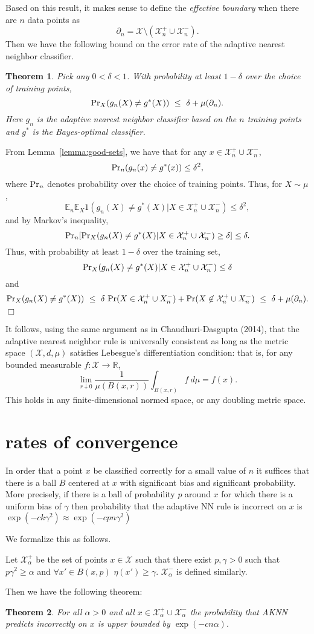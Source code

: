 \documentclass{article}
\def\R{{\mathbb{R}}}
\def\pr{{\rm Pr}}
\def\E{{\mathbb E}}
\def\X{{\mathcal X}}
\newtheorem{thm}{Theorem}
\newenvironment{proof}{\noindent {\sc Proof:}}{$\Box$ \medskip}
\begin{document}
Based on this result, it makes sense to define the {\it effective boundary} when there are $n$ data points as 
$$ \partial_n = \X \setminus (\X^+_n \cup \X^-_n) .$$
Then we have the following bound on the error rate of the adaptive nearest neighbor classifier.
\begin{thm}
Pick any $0 < \delta < 1$. With probability at least $1-\delta$ over the choice of training points,
$$ \pr_{X}(g_n(X) \neq g^*(X)) \ \leq \ \delta + \mu(\partial_n) .$$
Here $g_n$ is the adaptive nearest neighbor classifier based on the $n$ training points and $g^*$ is the Bayes-optimal classifier. 
\label{thm:general-error-bound}
\end{thm}
\begin{proof}
From Lemma~\ref{lemma:good-sets}, we have that for any $x \in \X^+_n \cup \X^-_n$, 
$$ \pr_n(g_n(x) \neq g^*(x)) \leq \delta^2 ,$$
where $\pr_n$ denotes probability over the choice of training points. Thus, for $X \sim \mu$,
$$ \E_n \E_X 1(g_n(X) \neq g^*(X) | X \in \X^+_n \cup \X^-_n) \leq \delta^2 ,$$
and by Markov's inequality,
$$ \pr_n [\pr_X (g_n(X) \neq g^*(X) |  X \in \X^+_n \cup \X^-_n) \geq \delta] \leq \delta.$$
Thus, with probability at least $1-\delta$ over the training set,
$$\pr_X (g_n(X) \neq g^*(X) |  X \in \X^+_n \cup \X^-_n) \leq \delta$$
and
$$ \pr_X(g_n(X) \neq g^*(X)) 
\ \leq \ \delta \ \pr(X \in \X^+_n \cup X^-_n) + \pr(X \not\in \X^+_n \cup X^-_n)
\ \leq \ \delta + \mu(\partial_n) .$$
\end{proof}

It follows, using the same argument as in Chaudhuri-Dasgupta (2014), that the adaptive nearest neighbor rule is universally consistent as long as the metric space $(\X, d, \mu)$ satisfies Lebesgue's differentiation condition: that is, for any bounded measurable $f: \X \rightarrow \R$,
$$ \lim_{r \downarrow 0} \frac{1}{\mu(B(x,r))} \int_{B(x,r)} f \ d\mu = f(x) .$$
This holds in any finite-dimensional normed space, or any doubling metric space.

\section{rates of convergence}

In order that a point $x$ be classified correctly for a small value of $n$ it suffices that there is a ball $B$ centered at $x$ with significant bias and significant probability. More precisely, if there is a ball of probability $p$ around $x$ for which there is a uniform bias of $\gamma$ then probability that the adaptive NN rule is incorrect 
on $x$ is $\exp(-c k \gamma^2) \approx \exp(-c p n \gamma^2)$

We formalize this as follows.

Let $\X_{\alpha}^+$ be the set of points $x \in \X$ such that there exist $p,\gamma>0$ such that $p \gamma^2 \geq \alpha$ and  $\forall x' \in B(x,p)$ $\eta(x')\geq \gamma$. $\X_{\alpha}^-$ is defined similarly.

Then we have the following theorem:
\begin{thm}
For all $\alpha>0$ and all $x \in \X_{\alpha}^+ \cup \X_{\alpha}^-$ the probability that AKNN predicts incorrectly on $x$ is upper bounded by $\exp(-c n \alpha)$.
\end{thm}
\end{document}
